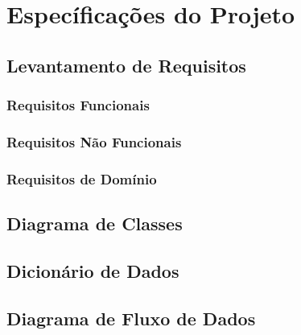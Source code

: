 \documentclass[../main.tex]{subfiles}
\begin{document}
\section{Específicações do Projeto}
\subsection{Levantamento de Requisitos}
\subsubsection{Requisitos Funcionais}
\subsubsection{Requisitos Não Funcionais}
\subsubsection{Requisitos de Domínio}
\subsection{Diagrama de Classes}
\subsection{Dicionário de Dados}
\subsection{Diagrama de Fluxo de Dados}
\end{document}

